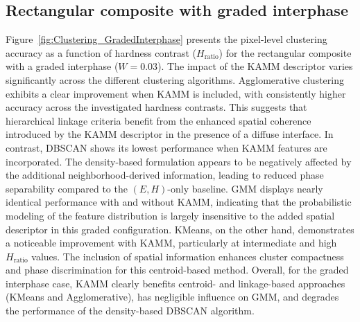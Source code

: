 \documentclass[final,3p,times]{elsarticle}
\begin{document}
\subsection{Rectangular composite with graded interphase}
\label{sec:results_rectComposite}

Figure~\ref{fig:Clustering_GradedInterphase} presents the pixel-level clustering accuracy as a function of hardness contrast ($H_\mathrm{ratio}$) for the rectangular composite with a graded interphase ($W = 0.03$). The impact of the KAMM descriptor varies significantly across the different clustering algorithms. Agglomerative clustering exhibits a clear improvement when KAMM is included, with consistently higher accuracy across the investigated hardness contrasts. This suggests that hierarchical linkage criteria benefit from the enhanced spatial coherence introduced by the KAMM descriptor in the presence of a diffuse interface. In contrast, DBSCAN shows its lowest performance when KAMM features are incorporated. The density-based formulation appears to be negatively affected by the additional neighborhood-derived information, leading to reduced phase separability compared to the $(E,H)$-only baseline. GMM displays nearly identical performance with and without KAMM, indicating that the probabilistic modeling of the feature distribution is largely insensitive to the added spatial descriptor in this graded configuration. KMeans, on the other hand, demonstrates a noticeable improvement with KAMM, particularly at intermediate and high $H_\mathrm{ratio}$ values. The inclusion of spatial information enhances cluster compactness and phase discrimination for this centroid-based method. Overall, for the graded interphase case, KAMM clearly benefits centroid- and linkage-based approaches (KMeans and Agglomerative), has negligible influence on GMM, and degrades the performance of the density-based DBSCAN algorithm.
\end{document}
